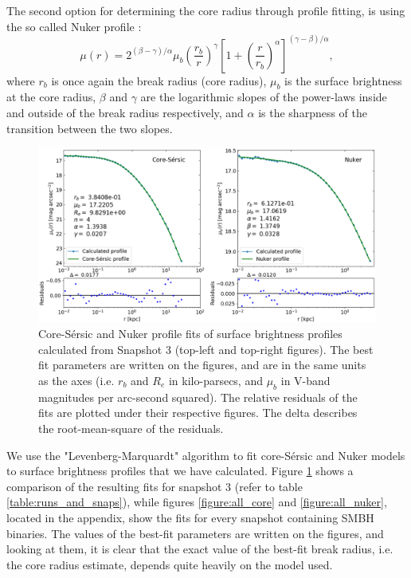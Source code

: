 \documentclass[english, oneside]{HYgradu}
\begin{document}
The second option for determining the core radius through profile fitting, is using the so called Nuker profile \citep{Lauer1995}:
\begin{equation}
\mu(r) = 2^{(\beta - \gamma) / \alpha} \mu_b \left( \frac{r_b}{r} \right)^\gamma \left[ 1 + \left( \frac{r}{r_b} \right)^\alpha \right]^{(\gamma - \beta)/\alpha},
\label{eq:nuker}
\end{equation}
where $r_b$ is once again the break radius (core radius), $\mu_b$ is the surface brightness at the core radius, $\beta$ and $\gamma$ are the logarithmic slopes of the power-laws inside and outside of the break radius respectively, and $\alpha$ is the sharpness of the transition between the two slopes.

\begin{figure}[h]
	\centering
	\includegraphics[width=\textwidth]{core_nuker_fits.png}
	\caption{Core-Sérsic and Nuker profile fits of surface brightness profiles calculated from Snapshot 3 (top-left and top-right figures). The best fit parameters are written on the figures, and are in the same units as the axes (i.e. $r_b$ and $R_e$ in kilo-parsecs, and $\mu_b$ in V-band magnitudes per arc-second squared). The relative residuals of the fits are plotted under their respective figures. The delta describes the root-mean-square of the residuals.}
	\label{figure:core_nuker}
\end{figure}

We use the "Levenberg-Marquardt" algorithm to fit core-Sérsic and Nuker models to surface brightness profiles that we have calculated. Figure \ref{figure:core_nuker} shows a comparison of the resulting fits for snapshot 3 (refer to table \ref{table:runs_and_snaps}), while figures \ref{figure:all_core} and \ref{figure:all_nuker}, located in the appendix, show the fits for every snapshot containing SMBH binaries. The values of the best-fit parameters are written on the figures, and looking at them, it is clear that the exact value of the best-fit break radius, i.e. the core radius estimate, depends quite heavily on the model used.
\end{document}
